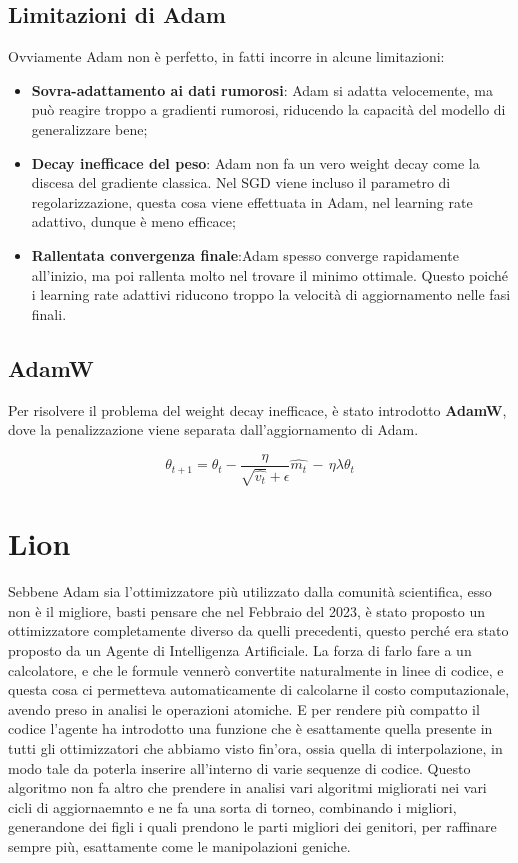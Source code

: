 \subsection{Limitazioni di Adam}
Ovviamente Adam non è perfetto, in fatti incorre in alcune limitazioni:

\begin{itemize}
    \item\textbf{Sovra-adattamento ai dati rumorosi}: Adam si adatta velocemente, ma può reagire troppo a gradienti rumorosi, riducendo la capacità del modello di generalizzare bene;
    \item \textbf{Decay inefficace del peso}: Adam non fa un vero weight decay come la discesa del gradiente classica. Nel SGD viene incluso il parametro di regolarizzazione, questa cosa viene effettuata in Adam, nel learning rate adattivo, dunque è meno efficace;
    \item\textbf{Rallentata convergenza finale}:Adam spesso converge rapidamente all'inizio, ma poi rallenta molto nel trovare il minimo ottimale. Questo poiché i learning rate adattivi riducono troppo la velocità di aggiornamento nelle fasi finali.
\end{itemize}

\subsection{AdamW}
Per risolvere il problema del weight decay inefficace, è stato introdotto \textbf{AdamW}, dove la penalizzazione viene separata dall’aggiornamento di Adam.

\begin{equation}
        \theta_{t+1} = \theta_t - \frac{\eta}{\sqrt{\hat{v_t}}+\epsilon}\hat{m_t}\,-\,\eta\lambda \theta_t
\end{equation}

\section{Lion}
Sebbene Adam sia l'ottimizzatore più utilizzato dalla comunità scientifica, esso non è il migliore, basti pensare che nel Febbraio del 2023, è stato proposto un ottimizzatore completamente diverso da quelli precedenti, questo perché era stato proposto da un Agente di Intelligenza Artificiale. La forza di farlo fare a un calcolatore, e che le formule vennerò convertite naturalmente in linee di codice, e questa cosa ci permetteva automaticamente di calcolarne il costo computazionale, avendo preso in analisi le operazioni atomiche. E per rendere più compatto il codice l'agente ha introdotto una funzione che è esattamente quella presente in tutti gli ottimizzatori che abbiamo visto fin'ora, ossia quella di interpolazione, in modo tale da poterla inserire all'interno di varie sequenze di codice. Questo algoritmo non fa altro che prendere in analisi vari algoritmi migliorati nei vari cicli di aggiornaemnto e ne fa una sorta di torneo, combinando i migliori, generandone dei figli i quali prendono le parti migliori dei genitori, per raffinare sempre più, esattamente come le manipolazioni geniche.

